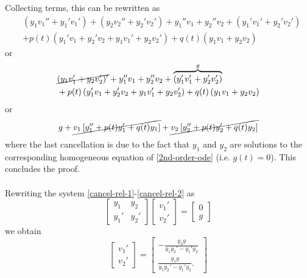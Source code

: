 \documentclass[12pt,reqno]{amsart}
\numberwithin{equation}{section}  %
\begin{document}
%
Collecting terms, this can be rewritten as
%
%
%
%
\begin{equation*}
\begin{split}
  & (y_{1}v_{1}'' + y_{1}' v_{1}') + (y_{2}v_{2}'' + y_{2}' v_{2}') + y_{1}''
  v_{1} + y_{2}'' v_{2} + (y_{1}'v_{1}' + y_{2}' v_{2}')
  \\
  & + p(t)\left(
  y_{1}'v_{1} + y_{2}' v_{2} + y_{1}v_{1}' + y_{2}v_{2}'
  \right) + q(t)\left( y_{1}v_{1} + y_{2}v_{2} \right)
  \end{split}
\end{equation*}
%
or
%
%
%
%
\begin{equation*}
\begin{split}
  & \cancel{(y_{1}v_{1}' + y_{2}v_{2}')'} + y_{1}''
  v_{1} + y_{2}'' v_{2} + \overbrace{(y_{1}'v_{1}' + y_{2}' v_{2}')}^{g}
  \\
  & + p(t)\left(
  y_{1}'v_{1} + y_{2}' v_{2} + y_{1}v_{1}' + y_{2}v_{2}'
  \right) + q(t)\left( y_{1}v_{1} + y_{2}v_{2} \right)
  \end{split}
\end{equation*}
%
%
or
%
%
\begin{equation*}
\begin{split}
  g + \cancel{v_{1}\left[ y_{1}'' + p(t)y_{1}' + q(t)y_{1} \right]} +
  \cancel{v_{2}\left[ y_{2}'' + p(t)y_{2}' + q(t)y_{2}
  \right]}
\end{split}
\end{equation*}
%
%
where the last cancellation is due to the fact that $y_{1}$ and $y_{2}$ are
solutions to the corresponding homogeneous equation of \eqref{2nd-order-ode}
(i.e. $g(t) = 0$). This concludes the proof. \qquad \qedsymbol
%
\\
\\
%
Rewriting the system \eqref{cancel-rel-1}-\eqref{cancel-rel-2}
as
  \begin{equation*}
  \begin{bmatrix}
    y_{1} & y_{2} \\
    y_{1}' & y_{2}'
  \end{bmatrix}
  \begin{bmatrix}
    v_{1}'
    \\
    v_{2}'
  \end{bmatrix}=
  \begin{bmatrix}
  0 \\
  g
  \end{bmatrix}
\end{equation*}
  we obtain 
  \begin{equation*}
\begin{bmatrix}
  v_{1}'
  \\
  v_{2}'
\end{bmatrix}=
\begin{bmatrix}
  -\frac{y_{2}g}{y_{1}y_{2}' - y_{1}' y_{2}} \\
  \frac{y_{1}g}{y_{1}y_{2}' - y_{1}' y_{2}}.
\end{bmatrix}
\end{equation*}
\end{document}
